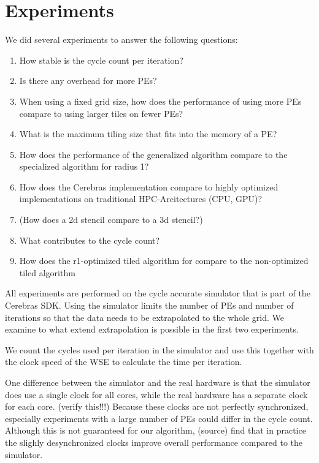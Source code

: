 \documentclass{article}
\begin{document}
\section{Experiments}
We did several experiments to answer the following questions:
\begin{enumerate}
    \item How stable is the cycle count per iteration?
    \item Is there any overhead for more PEs?
    \item When using a fixed grid size, how does the performance of using more PEs compare to using larger tiles on fewer PEs?
    \item What is the maximum tiling size that fits into the memory of a PE?
    \item How does the performance of the generalized algorithm compare to the specialized algorithm for radius 1?
    \item How does the Cerebras implementation compare to highly optimized implementations on traditional HPC-Arcitectures (CPU, GPU)?
    \item (How does a 2d stencil compare to a 3d stencil?)
    \item What contributes to the cycle count?
    \item How does the r1-optimized tiled algorithm for compare to the non-optimized tiled algorithm
\end{enumerate}

All experiments are performed on the cycle accurate simulator that is part of the Cerebras SDK.
Using the simulator limits the number of PEs and number of iterations so that the data needs to be extrapolated to the whole grid.
We examine to what extend extrapolation is possible in the first two experiments.

We count the cycles used per iteration in the simulator and use this together with the clock speed of the WSE to calculate the time per iteration.

One difference between the simulator and the real hardware is that the simulator does use a single clock for all cores, while the real hardware has a separate clock for each core. (verify this!!!) Because these clocks are not perfectly synchronized, especially experiments with a large number of PEs could differ in the cycle count. Although this is not guaranteed for our algorithm, (source) find that in practice the slighly desynchronized clocks improve overall performance compared to the simulator. 
\end{document}
